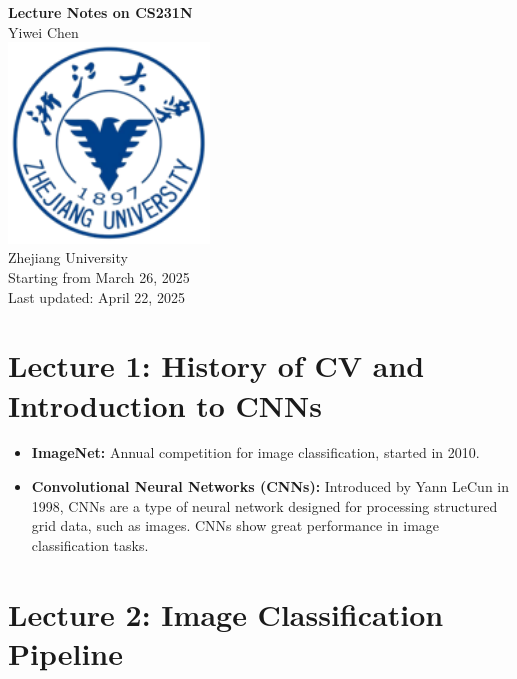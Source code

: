 \documentclass{article}
\numberwithin{equation}{section}
\begin{document}
\begin{CJK}{UTF8}{gbsn}
\begin{titlepage}
    \centering
    \vspace*{2cm}
    {\Huge \textbf{Lecture Notes on CS231N}}\\[1.5cm]
    {\Large Yiwei Chen}\\[0.5cm]
    \vfill
    \includegraphics[width=0.4\textwidth]{images/school_badge.png}\\[1cm] %
    {\large Zhejiang University}\\[1cm]
    {\large Starting from March 26, 2025}\\[0.5cm]
    {\large Last updated: April 22, 2025}
\end{titlepage}

\onehalfspacing %

\tableofcontents %
\newpage

\section*{Lecture 1: History of CV and Introduction to CNNs}
\setcounter{section}{1}
\setcounter{subsection}{0}
\setcounter{equation}{0}
\begin{itemize}
    \item \textbf{ImageNet:} Annual competition for image classification, started in 2010.
    \item \textbf{Convolutional Neural Networks (CNNs):} Introduced by Yann LeCun in 1998, CNNs are a type of neural network designed for processing structured grid data, such as images. CNNs show great performance in image classification tasks.
\end{itemize}

\newpage

\section*{Lecture 2: Image Classification Pipeline}
\setcounter{section}{2}
\setcounter{equation}{0}

\end{CJK}
\end{document}
